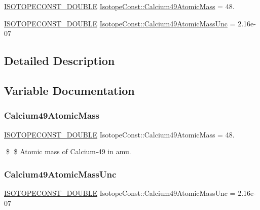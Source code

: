 \begin{DoxyCompactItemize}
\item 
\mbox{\hyperlink{group___isotope_const-_macros_ga8f45a7272ce02c0b4c65c44636ed719a}{I\+S\+O\+T\+O\+P\+E\+C\+O\+N\+S\+T\+\_\+\+D\+O\+U\+B\+LE}} \mbox{\hyperlink{group___isotope_const-_calcium-_ca49_ga6467cc8fea6b5002327717c036d7debb}{Isotope\+Const\+::\+Calcium49\+Atomic\+Mass}} = 48.
\item 
\mbox{\hyperlink{group___isotope_const-_macros_ga8f45a7272ce02c0b4c65c44636ed719a}{I\+S\+O\+T\+O\+P\+E\+C\+O\+N\+S\+T\+\_\+\+D\+O\+U\+B\+LE}} \mbox{\hyperlink{group___isotope_const-_calcium-_ca49_gab74dc3507adf7456353c2dfbf53303a3}{Isotope\+Const\+::\+Calcium49\+Atomic\+Mass\+Unc}} = 2.\+16e-\/07
\end{DoxyCompactItemize}


\subsection{Detailed Description}


\subsection{Variable Documentation}
\mbox{\label{group___isotope_const-_calcium-_ca49_ga6467cc8fea6b5002327717c036d7debb}} 
\subsubsection{\texorpdfstring{Calcium49\+Atomic\+Mass}{Calcium49AtomicMass}}
{\footnotesize\ttfamily \mbox{\hyperlink{group___isotope_const-_macros_ga8f45a7272ce02c0b4c65c44636ed719a}{I\+S\+O\+T\+O\+P\+E\+C\+O\+N\+S\+T\+\_\+\+D\+O\+U\+B\+LE}} Isotope\+Const\+::\+Calcium49\+Atomic\+Mass = 48.}

\$ \$ Atomic mass of Calcium-\/49 in amu. \mbox{\label{group___isotope_const-_calcium-_ca49_gab74dc3507adf7456353c2dfbf53303a3}} 
\subsubsection{\texorpdfstring{Calcium49\+Atomic\+Mass\+Unc}{Calcium49AtomicMassUnc}}
{\footnotesize\ttfamily \mbox{\hyperlink{group___isotope_const-_macros_ga8f45a7272ce02c0b4c65c44636ed719a}{I\+S\+O\+T\+O\+P\+E\+C\+O\+N\+S\+T\+\_\+\+D\+O\+U\+B\+LE}} Isotope\+Const\+::\+Calcium49\+Atomic\+Mass\+Unc = 2.\+16e-\/07}

